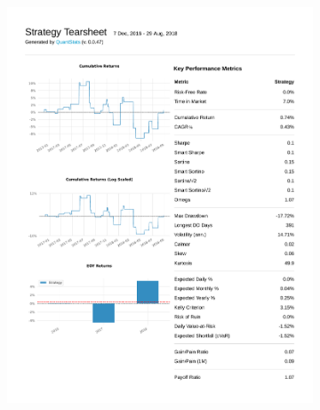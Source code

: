 \documentclass[12pt,a4paper]{article}
\begin{document}
\begin{figure}[ht!]
  \centering
  \begin{subfigure}[ht!]{0.45\textwidth}
    \includegraphics[width=\textwidth]{plots/qs_ppo.pdf}
  \end{subfigure}
  \hspace{0.05\textwidth}
  \begin{subfigure}[ht!]{0.45\textwidth}

\end{subfigure}
\end{figure}
\end{document}
